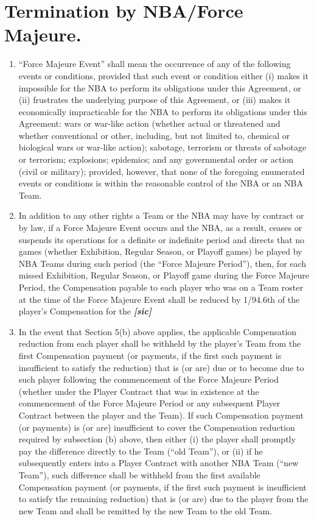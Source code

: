 \documentclass[
]{book}
\providecommand{\tightlist}{%
  \setlength{\itemsep}{0pt}\setlength{\parskip}{0pt}}
\begin{document}
\hypertarget{termination-by-nbaforce-majeure.}{%
\section{Termination by NBA/Force Majeure.}\label{termination-by-nbaforce-majeure.}}

\begin{enumerate}
\def\labelenumi{(\alph{enumi})}
\tightlist
\item
  ``Force Majeure Event'' shall mean the occurrence of any of the following events or conditions, provided that such event or condition either (i) makes it impossible for the NBA to perform its obligations under this Agreement, or (ii) frustrates the underlying purpose of this Agreement, or (iii) makes it economically impracticable for the NBA to perform its obligations under this Agreement: wars or war-like action (whether actual or threatened and whether conventional or other, including, but not limited to, chemical or biological wars or war-like action); sabotage, terrorism or threats of sabotage or terrorism; explosions; epidemics; and any governmental order or action (civil or military); provided, however, that none of the foregoing enumerated events or conditions is within the reasonable control of the NBA or an NBA Team.
\item
  In addition to any other rights a Team or the NBA may have by contract or by law, if a Force Majeure Event occurs and the NBA, as a result, ceases or suspends its operations for a definite or indefinite period and directs that no games (whether Exhibition, Regular Season, or Playoff games) be played by NBA Teams during such period (the ``Force Majeure Period''), then, for each missed Exhibition, Regular Season, or Playoff game during the Force Majeure Period, the Compensation payable to each player who was on a Team roster at the time of the Force Majeure Event shall be reduced by 1/94.6th of the player's Compensation for the \textbf{\emph{{[}sic{]}}}
\item
  In the event that Section 5(b) above applies, the applicable Compensation reduction from each player shall be withheld by the player's Team from the first Compensation payment (or payments, if the first such payment is insufficient to satisfy the reduction) that is (or are) due or to become due to such player following the commencement of the Force Majeure Period (whether under the Player Contract that was in existence at the commencement of the Force Majeure Period or any subsequent Player Contract between the player and the Team). If such Compensation payment (or payments) is (or are) insufficient to cover the Compensation reduction required by subsection (b) above, then either (i) the player shall promptly pay the difference directly to the Team (``old Team''), or (ii) if he subsequently enters into a Player Contract with another NBA Team (``new Team''), such difference shall be withheld from the first available Compensation payment (or payments, if the first such payment is insufficient to satisfy the remaining reduction) that is (or are) due to the player from the new Team and shall be remitted by the new Team to the old Team.

\end{enumerate}
\end{document}

